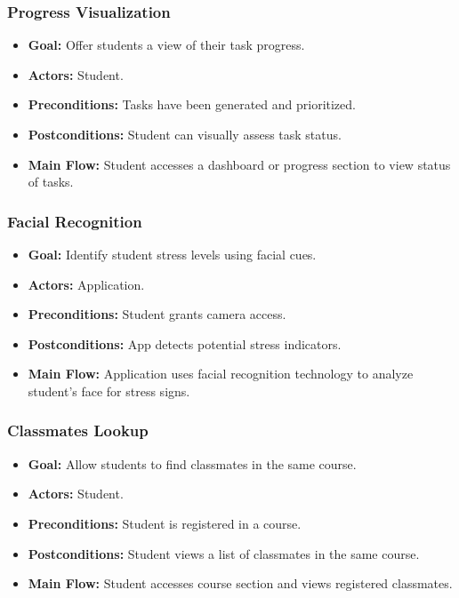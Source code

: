 \documentclass[12pt]{article}
\begin{document}
\subsubsection{Progress Visualization}
\begin{itemize}
    \item \textbf{Goal:} Offer students a view of their task progress.
    \item \textbf{Actors:} Student.
    \item \textbf{Preconditions:} Tasks have been generated and prioritized.
    \item \textbf{Postconditions:} Student can visually assess task status.
    \item \textbf{Main Flow:} Student accesses a dashboard or progress section to view status of tasks.
\end{itemize}

\subsubsection{Facial Recognition}
\begin{itemize}
    \item \textbf{Goal:} Identify student stress levels using facial cues.
    \item \textbf{Actors:} Application.
    \item \textbf{Preconditions:} Student grants camera access.
    \item \textbf{Postconditions:} App detects potential stress indicators.
    \item \textbf{Main Flow:} Application uses facial recognition technology to analyze student's face for stress signs.
\end{itemize}

\subsubsection{Classmates Lookup}
\begin{itemize}
    \item \textbf{Goal:} Allow students to find classmates in the same course.
    \item \textbf{Actors:} Student.
    \item \textbf{Preconditions:} Student is registered in a course.
    \item \textbf{Postconditions:} Student views a list of classmates in the same course.
    \item \textbf{Main Flow:} Student accesses course section and views registered classmates.
\end{itemize}
\end{document}
